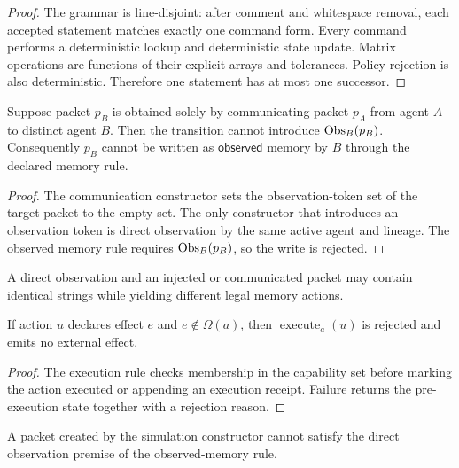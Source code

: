\begin{proof}
The grammar is line-disjoint: after comment and whitespace removal, each
accepted statement matches exactly one command form.  Every command performs a
deterministic lookup and deterministic state update.  Matrix operations are
functions of their explicit arrays and tolerances.  Policy rejection is also
deterministic.  Therefore one statement has at most one successor.
\end{proof}

\begin{theorem}
Suppose packet \(p_B\) is obtained solely by communicating packet \(p_A\) from
agent \(A\) to distinct agent \(B\).  Then the transition cannot introduce
\(\operatorname{Obs}_B(p_B)\).  Consequently \(p_B\) cannot be written as
\(\mathsf{observed}\) memory by \(B\) through the declared memory rule.
\end{theorem}

\begin{proof}
The communication constructor sets the observation-token set of the target
packet to the empty set.  The only constructor that introduces an observation
token is direct observation by the same active agent and lineage.  The observed
memory rule requires \(\operatorname{Obs}_B(p_B)\), so the write is rejected.
\end{proof}

\begin{corollary}
A direct observation and an injected or communicated packet may contain
identical strings while yielding different legal memory actions.
\end{corollary}

\begin{theorem}
If action \(u\) declares effect \(e\) and \(e\notin\Omega(a)\), then
\(\operatorname{execute}_a(u)\) is rejected and emits no external effect.
\end{theorem}

\begin{proof}
The execution rule checks membership in the capability set before marking the
action executed or appending an execution receipt.  Failure returns the
pre-execution state together with a rejection reason.
\end{proof}

\begin{theorem}
A packet created by the simulation constructor cannot satisfy the direct
observation premise of the observed-memory rule.
\end{theorem}

